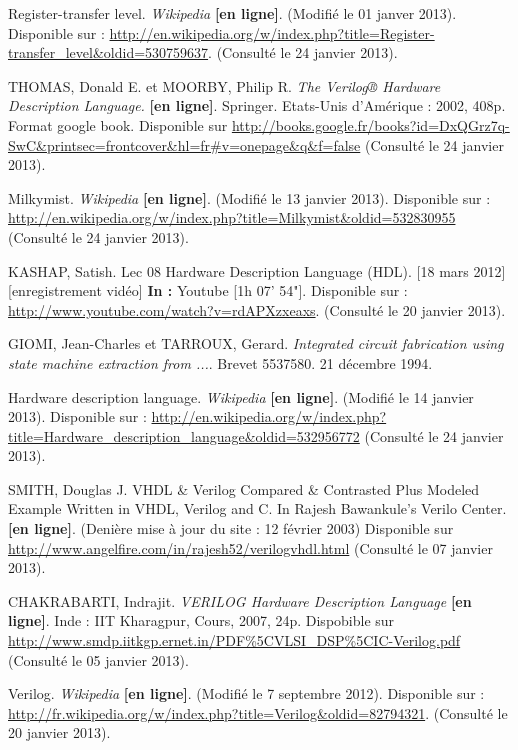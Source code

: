\documentclass{report}
\begin{document}
\begin{thebibliography}{1}

Register-transfer level. \textit{Wikipedia} \textbf{[en ligne]}. (Modifié le 01 janver 2013). Disponible sur : \url{http://en.wikipedia.org/w/index.php?title=Register-transfer\_level\&oldid=530759637}. (Consulté le 24 janvier 2013).

THOMAS, Donald E. et MOORBY, Philip R. \textit{The Verilog® Hardware Description Language.} \textbf{[en ligne]}. Springer. Etats-Unis d'Amérique : 2002, 408p. Format google book. Disponible sur \url{http://books.google.fr/books?id=DxQGrz7q-SwC\&printsec=frontcover\&hl=fr#v=onepage\&q\&f=false} (Consulté le 24 janvier 2013).

Milkymist. \textit{Wikipedia} \textbf{[en ligne]}. (Modifié le 13 janvier 2013). Disponible sur : \url{http://en.wikipedia.org/w/index.php?title=Milkymist\&oldid=532830955} (Consulté le 24 janvier 2013).

KASHAP, Satish. Lec 08 Hardware Description Language (HDL). [18 mars 2012] [enregistrement vidéo] \textbf{In :} Youtube [1h 07' 54"]. Disponible sur : \url{http://www.youtube.com/watch?v=rdAPXzxeaxs}. (Consulté le 20 janvier 2013).

GIOMI, Jean-Charles et TARROUX, Gerard. \textit{Integrated circuit fabrication using state machine extraction from ...}. Brevet 5537580. 21 décembre 1994.

Hardware description language. \textit{Wikipedia} \textbf{[en ligne]}. (Modifié le 14 janvier 2013). Disponible sur : \url{http://en.wikipedia.org/w/index.php?title=Hardware\_description\_language\&oldid=532956772} (Consulté le 24 janvier 2013).

SMITH, Douglas J. VHDL \& Verilog Compared \& Contrasted Plus Modeled Example Written in VHDL, Verilog and C. In Rajesh Bawankule's Verilo Center. \textbf{[en ligne]}. (Denière mise à jour du site : 12 février 2003) Disponible sur \url{http://www.angelfire.com/in/rajesh52/verilogvhdl.html} (Consulté le 07 janvier 2013).

CHAKRABARTI, Indrajit. \textit{VERILOG Hardware Description Language} \textbf{[en ligne]}. Inde : IIT Kharagpur, Cours, 2007, 24p. Dispobible sur \url{http://www.smdp.iitkgp.ernet.in/PDF\%5CVLSI_DSP\%5CIC-Verilog.pdf} (Consulté le 05 janvier 2013).

Verilog. \textit{Wikipedia} \textbf{[en ligne]}. (Modifié le 7 septembre 2012). Disponible sur : \url{http://fr.wikipedia.org/w/index.php?title=Verilog\&oldid=82794321}. (Consulté le 20 janvier 2013).


\end{thebibliography}
\end{document}
